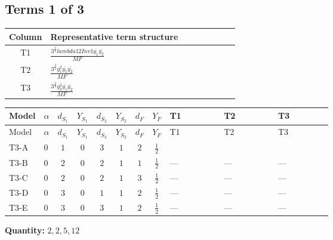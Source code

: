 \documentclass[8pt]{article}
\begin{document}
\begin{landscape}
\subsection*{Terms 1 of 3}
\begin{center}
\begin{tabular}{@{}c >{\raggedright\arraybackslash}p{0.82\linewidth}@{}}
\toprule
Column & Representative term structure \\
\midrule
T1 & \(\displaystyle \frac{3^{\frac{3}{4}} lambda12Inv1 \overline{y_{1}} \overline{y_{2}}}{MF}\) \\
\midrule
T2 & \(\displaystyle \frac{3^{\frac{3}{4}} g_{1}^{2} \overline{y_{1}} \overline{y_{2}}}{MF}\) \\
\midrule
T3 & \(\displaystyle \frac{3^{\frac{3}{4}} g_{2}^{2} \overline{y_{1}} \overline{y_{2}}}{MF}\) \\
\midrule
\bottomrule
\end{tabular}
\end{center}
\smallskip
\tiny
\begin{longtable}{@{}llcccccc >{\raggedright\arraybackslash}p{0.21\linewidth} >{\raggedright\arraybackslash}p{0.21\linewidth} >{\raggedright\arraybackslash}p{0.21\linewidth}@{}}
\toprule
Model & $\alpha$ & $d_{S_1}$ & $Y_{S_1}$ & $d_{S_2}$ & $Y_{S_2}$ & $d_F$ & $Y_F$ & T1 & T2 & T3 \\
\midrule
\endfirsthead
\toprule
Model & $\alpha$ & $d_{S_1}$ & $Y_{S_1}$ & $d_{S_2}$ & $Y_{S_2}$ & $d_F$ & $Y_F$ & T1 & T2 & T3 \\
\midrule
\endhead
T3-A & $0$ & $1$ & $0$ & $3$ & $1$ & $2$ & $\frac{1}{2}$ & \scriptsize\adjustbox{max width=\linewidth}{$\begin{gathered} \frac{3^{\frac{3}{4}} lambda12Inv1 \overline{y_{1}} \overline{y_{2}}}{6 MF}\end{gathered}$} & \scriptsize\adjustbox{max width=\linewidth}{$\begin{gathered} \frac{3^{\frac{3}{4}} g_{1}^{2} \overline{y_{1}} \overline{y_{2}}}{8 MF}\end{gathered}$} & \scriptsize\adjustbox{max width=\linewidth}{$\begin{gathered} \frac{11 \cdot 3^{\frac{3}{4}} g_{2}^{2} \overline{y_{1}} \overline{y_{2}}}{8 MF}\end{gathered}$} \\
\midrule
T3-B & $0$ & $2$ & $0$ & $2$ & $1$ & $1$ & $\frac{1}{2}$ & --- & --- & --- \\
\midrule
T3-C & $0$ & $2$ & $0$ & $2$ & $1$ & $3$ & $\frac{1}{2}$ & --- & --- & --- \\
\midrule
T3-D & $0$ & $3$ & $0$ & $1$ & $1$ & $2$ & $\frac{1}{2}$ & --- & --- & --- \\
\midrule
T3-E & $0$ & $3$ & $0$ & $3$ & $1$ & $2$ & $\frac{1}{2}$ & --- & --- & --- \\
\midrule
\bottomrule
\end{longtable}
\clearpage
\noindent\textbf{Quantity: }$\mathrm{2,2,5,12}$\par\smallskip

\end{landscape}
\end{document}
